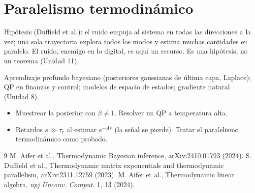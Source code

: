 \documentclass[11pt,a4paper]{article}
\begin{document}
\section{Paralelismo termodinámico}
Hipótesis (Duffield et al.): el ruido empuja al sistema en todas las direcciones a la vez; una sola trayectoria explora todos los modos y estima muchas
cantidades en paralelo. El ruido, enemigo en lo digital, es aquí un recurso. Es una hipótesis, no un teorema (Unidad 11).

\begin{aplicacion}
Aprendizaje profundo bayesiano (posteriores gaussianas de última capa, Laplace); QP en finanzas y control; modelos de espacio de estados; gradiente natural (Unidad 8).
\end{aplicacion}

\begin{error}
\begin{itemize}[nosep]
\item Muestrear la posterior con $\beta\ne1$. \quad Resolver un QP a temperatura alta.
\item Retardos $s\gg\tau_r$ al estimar $e^{-As}$ (la señal se pierde). \quad Tratar el paralelismo termodinámico como probado.
\end{itemize}
\end{error}

\begin{thebibliography}{9}\small
{} M. Aifer et al., Thermodynamic Bayesian inference, arXiv:2410.01793 (2024).
 S. Duffield et al., Thermodynamic matrix exponentials and thermodynamic parallelism, arXiv:2311.12759 (2023).
 M. Aifer et al., Thermodynamic linear algebra, \emph{npj Unconv. Comput.} 1, 13 (2024).
\end{thebibliography}
\end{document}
